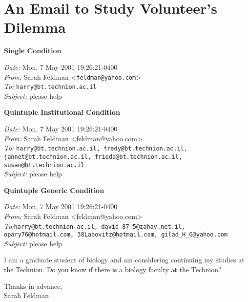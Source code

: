 \clearemptydoublepage
{}
\chapter{An Email to Study Volunteer's Dilemma}
\label{app:EmaiVolunDilem}

\textbf{Single Condition}

\emph{Date:} Mon, 7 May 2001 19:26:21-0400 \\
\emph{From:} Sarah Feldman <\nolinkurl{feldman@yahoo.com}> \\
\emph{To:} \nolinkurl{harry@bt.technion.ac.il} \\
\emph{Subject:} please help
\vspace{0.2cm}

\textbf{Quintuple Institutional Condition}

\emph{Date:} Mon, 7 May 2001 19:26:21-0400 \\
\emph{From:} Sarah Feldman <feldman@yahoo.com> \\
\emph{To:} \nolinkurl{harry@bt.technion.ac.il, fredy@bt.technion.ac.il, jannet@bt.technion.ac.il, frieda@bt.technion.ac.il, susan@bt.technion.ac.il} \\
\emph{Subject:} please help
\vspace{0.2cm}

\textbf{Quintuple Generic Condition}

\emph{Date:} Mon, 7 May 2001 19:26:21-0400 \\
\emph{From:} Sarah Feldman <feldman@yahoo.com> \\
\emph{To:}\nolinkurl{harry@bt.technion.ac.il, david_87_5@zahav.net.il, opary76@hotmail.com, 38Labovitz@hotmail.com, gilad_H_G@yahoo.com} \\
\emph{Subject:} please help
\vspace{0.5cm}

I am a graduate student of biology and am considering continuing my studies at the Technion. Do you know if there is a biology faculty at the Technion?
\vspace{0.5cm}

Thanks in advance,\\
Sarah Feldman


